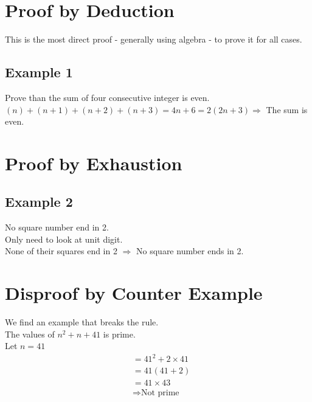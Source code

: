 \documentclass[class=article, crop=false]{standalone}
\begin{document}
\section*{Proof by Deduction}
This is the most direct proof - generally using algebra - to prove it for all cases. \\
\subsection*{Example 1}
Prove than the sum of four consecutive integer is even. \\
$(n) + (n+1) + (n+2) + (n+3) = 4n + 6 = 2(2n + 3) \Rightarrow$ The sum is even. \\
\section*{Proof by Exhaustion}
\subsection*{Example 2}
No square number end in 2. \\
Only need to look at unit digit. \\
None of their squares end in 2 $\Rightarrow$ No square number ends in 2. \\
\section*{Disproof by Counter Example}
We find an example that breaks the rule. \\
The values of $n^2 + n + 41$ is prime. \\
Let $n = 41$ \\
\begin{align*}
& = 41^2 + 2 \times 41 \\
& = 41(41 + 2) \\
& = 41 \times 43 \\
& \Rightarrow \text{Not prime}
\end{align*}
\end{document}
